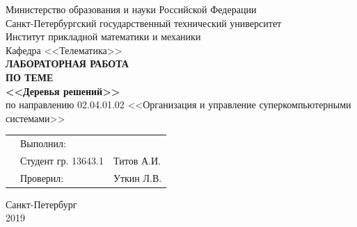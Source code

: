 \documentclass[]{article}
\numberwithin{equation}{section}
\begin{document}
    \thispagestyle{empty}
	\begin{center}
        Министерство образования и науки Российской Федерации\\
		Санкт-Петербургский государственный технический университет\\
		Институт прикладной математики и механики\\
		Кафедра <<Телематика>>\\
		\vspace{5cm}
		\textbf{\textbf{ЛАБОРАТОРНАЯ РАБОТА}}\\
        \vspace{0.5cm}
        \textbf{ПО ТЕМЕ}\\
        \vspace{0.5cm}
		\textbf{\textbf{<<Деревья решений>>}}\\
		\vspace{3cm}
		по направлению 02.04.01.02 <<Организация и управление суперкомпьютерными системами>>
	\end{center}
	\vspace{2cm}
	\begin{tabular} {l l l}
	\hspace{9.5cm} & Выполнил: & \\
	& Студент гр. 13643.1 & Титов А.И.\\
	& Проверил: & Уткин Л.В.
	\end{tabular}
	\vspace{4.5cm}
	\begin{center}
		Санкт-Петербург\\
		2019
    \end{center}


	\renewcommand\contentsname{Оглавление}
	\tableofcontents

    \newpage
\end{document}
